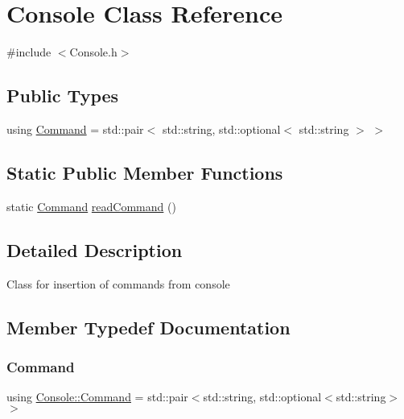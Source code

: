 \hypertarget{classConsole}{}\section{Console Class Reference}
\label{classConsole}


{\ttfamily \#include $<$Console.\+h$>$}

\subsection*{Public Types}
\begin{DoxyCompactItemize}
\item 
using \hyperlink{classConsole_a02cf1ce14565d852415e41cce4861621}{Command} = std\+::pair$<$ std\+::string, std\+::optional$<$ std\+::string $>$ $>$
\end{DoxyCompactItemize}
\subsection*{Static Public Member Functions}
\begin{DoxyCompactItemize}
\item 
static \hyperlink{classConsole_a02cf1ce14565d852415e41cce4861621}{Command} \hyperlink{classConsole_ab4b82381e77a8641dca39301f5c36a3b}{read\+Command} ()
\end{DoxyCompactItemize}


\subsection{Detailed Description}
Class for insertion of commands from console 

\subsection{Member Typedef Documentation}
\mbox{\label{classConsole_a02cf1ce14565d852415e41cce4861621}} 
\subsubsection{\texorpdfstring{Command}{Command}}
{\footnotesize\ttfamily using \hyperlink{classConsole_a02cf1ce14565d852415e41cce4861621}{Console\+::\+Command} =  std\+::pair$<$std\+::string, std\+::optional$<$std\+::string$>$ $>$}

